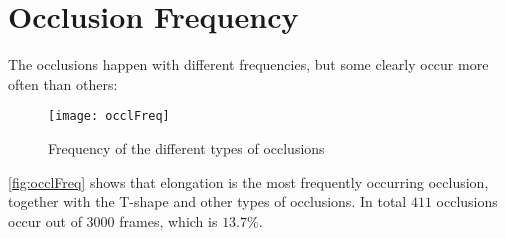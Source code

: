 \section{Occlusion Frequency}
The occlusions happen with different frequencies, but some clearly occur more often than others:

\begin{figure}[H]
	\centering
	\texttt{[image: occlFreq]}
	\caption{Frequency of the different types of occlusions}
	\label{fig:occlFreq}
\end{figure}

\autoref{fig:occlFreq} shows that elongation is the most frequently occurring occlusion, together with the T-shape and other types of occlusions. In total $ 411 $ occlusions occur out of $ 3000 $ frames, which is $13.7\%$.